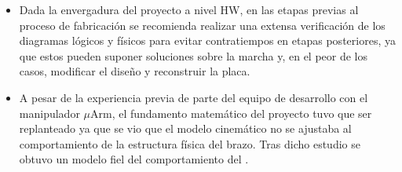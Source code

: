 \begin{itemize}
    \item Dada la envergadura del proyecto a nivel \ac{HW}, en las etapas previas al proceso de fabricación se recomienda realizar una extensa verificación de los diagramas lógicos y físicos para evitar contratiempos en etapas posteriores, ya que estos pueden suponer soluciones sobre la marcha y, en el peor de los casos, modificar el diseño y reconstruir la placa.
    \item A pesar de la experiencia previa de parte del equipo de desarrollo con el manipulador $\mu$Arm, el fundamento matemático del proyecto tuvo que ser replanteado ya que se vio que el modelo cinemático no se ajustaba al comportamiento de la estructura física del brazo. Tras dicho estudio se obtuvo un modelo fiel del comportamiento del \pArm.
\end{itemize}